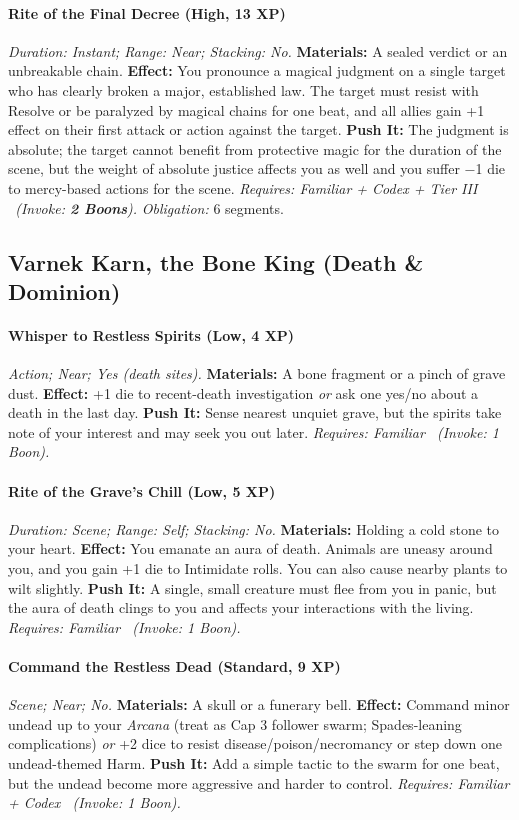 \paragraph{Rite of the Final Decree (High, 13 XP)} \emph{Duration: Instant; Range: Near; Stacking: No.}
\textbf{Materials:} A sealed verdict or an unbreakable chain.
\textbf{Effect:} You pronounce a magical judgment on a single target who has clearly broken a major, established law. The target must resist with Resolve or be paralyzed by magical chains for one beat, and all allies gain +1 effect on their first attack or action against the target.
\textbf{Push It:} The judgment is absolute; the target cannot benefit from protective magic for the duration of the scene, but the weight of absolute justice affects you as well and you suffer −1 die to mercy-based actions for the scene.
\emph{Requires: Familiar + Codex + Tier III \ (\textit{Invoke:} \textbf{2 Boons}).}
\emph{Obligation:} 6 segments.

\subsection{Varnek Karn, the Bone King (Death \& Dominion)}
\paragraph{Whisper to Restless Spirits (Low, 4 XP)} \emph{Action; Near; Yes (death sites).}
\textbf{Materials:} A bone fragment or a pinch of grave dust.
\textbf{Effect:} +1 die to recent-death investigation \emph{or} ask one yes/no about a death in the last day.
\textbf{Push It:} Sense nearest unquiet grave, but the spirits take note of your interest and may seek you out later.
\emph{Requires: Familiar \ (\textit{Invoke:} 1 Boon).}
\paragraph{Rite of the Grave's Chill (Low, 5 XP)} \emph{Duration: Scene; Range: Self; Stacking: No.}
\textbf{Materials:} Holding a cold stone to your heart.
\textbf{Effect:} You emanate an aura of death. Animals are uneasy around you, and you gain +1 die to Intimidate rolls. You can also cause nearby plants to wilt slightly.
\textbf{Push It:} A single, small creature must flee from you in panic, but the aura of death clings to you and affects your interactions with the living.
\emph{Requires: Familiar \ (\textit{Invoke:} 1 Boon).}
\paragraph{Command the Restless Dead (Standard, 9 XP)} \emph{Scene; Near; No.}
\textbf{Materials:} A skull or a funerary bell.
\textbf{Effect:} Command minor undead up to your \emph{Arcana} (treat as Cap 3 follower swarm; Spades-leaning complications) \emph{or} +2 dice to resist disease/poison/necromancy or step down one undead-themed Harm.
\textbf{Push It:} Add a simple tactic to the swarm for one beat, but the undead become more aggressive and harder to control.
\emph{Requires: Familiar + Codex \ (\textit{Invoke:} 1 Boon).}
